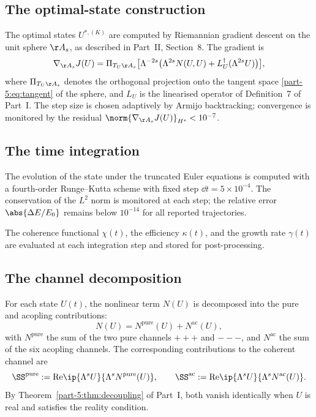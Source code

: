 \subsection{The optimal-state construction}
\label{part-5:ssec:optimal-construction}

The optimal states $U^{\ast,(K)}$ are computed by Riemannian gradient 
descent on the unit sphere $\AA_s$, as described in Part~II, 
Section~8. The gradient is
\begin{equation}\label{part-5:eq:grad-J}
\nabla_{\AA_s}J(U) = \Pi_{T_U\AA_s}\bigl[\Lambda^{-2s}\bigl(
\Lambda^{2s}N(U,U) + L_U^\dagger(\Lambda^{2s}U)\bigr)\bigr],
\end{equation}
where $\Pi_{T_U\AA_s}$ denotes the orthogonal projection onto the 
tangent space \eqref{part-5:eq:tangent} of the sphere, and $L_U$ is the 
linearised operator of Definition~7 of Part~I. The step size is 
chosen adaptively by Armijo backtracking; convergence is monitored 
by the residual $\norm{\nabla_{\AA_s}J(U)}_{H^s}<10^{-7}$.

\subsection{The time integration}
\label{part-5:ssec:time-integration}

The evolution of the state under the truncated Euler equations is 
computed with a fourth-order Runge--Kutta scheme with fixed step 
$\dd t = 5\times 10^{-4}$. The conservation of the $L^2$ norm is 
monitored at each step; the relative error $\abs{\Delta E/E_0}$ 
remains below $10^{-14}$ for all reported trajectories.

The coherence functional $\chi(t)$, the efficiency $\kappa(t)$, and 
the growth rate $\gamma(t)$ are evaluated at each integration step 
and stored for post-processing.

\subsection{The channel decomposition}
\label{part-5:ssec:channel-decomposition}

For each state $U(t)$, the nonlinear term $N(U)$ is decomposed into 
the pure and acopling contributions:
\begin{equation}\label{part-5:eq:decomp-N}
N(U) = N^{\mathrm{pure}}(U) + N^{\mathrm{ac}}(U),
\end{equation}
with $N^{\mathrm{pure}}$ the sum of the two pure channels $+++$ and 
$---$, and $N^{\mathrm{ac}}$ the sum of the six acopling channels. The 
corresponding contributions to the coherent channel are
\begin{equation}\label{part-5:eq:S-pure-ac}
\SS^{\mathrm{pure}} := \mathrm{Re}\ip{\Lambda^s U}{\Lambda^s N^{\mathrm{pure}}(U)},
\qquad
\SS^{\mathrm{ac}} := \mathrm{Re}\ip{\Lambda^s U}{\Lambda^s N^{\mathrm{ac}}(U)}.
\end{equation}
By Theorem~\ref{part-5:thm:decoupling} of Part~I, both vanish identically 
when $U$ is real and satisfies the reality condition.

